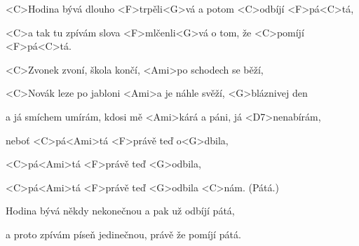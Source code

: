 
\zs
<C>Hodina bývá dlouho <F>trpěli<G>vá a potom <C>odbíjí <F>pá<C>tá,

<C>a tak tu zpívám slova <F>mlčenli<G>vá o tom, že <C>pomíjí <F>pá<C>tá.
\ks

\zr
<C>Zvonek zvoní, škola končí, <Ami>po schodech se běží,

<C>Novák leze po jabloni <Ami>a je náhle svěží, <G>bláznivej den

a já smíchem umírám, kdosi mě <Ami>kárá a páni, já <D7>nenabírám,

neboť <C>pá<Ami>tá <F>právě teď o<G>dbila,

<C>pá<Ami>tá <F>právě teď <G>odbila,

<C>pá<Ami>tá <F>právě teď <G>odbila <C>nám. (Pátá.)
\kr

\zs
Hodina bývá někdy nekonečnou a pak už odbíjí pátá,

a proto zpívám píseň jedinečnou, právě že pomíjí pátá.
\ks


\zr \kr

\kp
